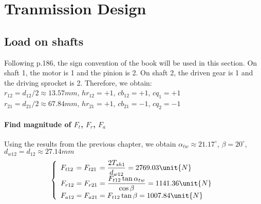 \section{Tranmission Design}
\subsection{Load on shafts}
Following p.186, the sign convention of the book will be used in this section. On shaft 1, the motor is 1 and the pinion is 2. On shaft 2, the driven gear is 1 and the driving sprocket is 2. Therefore, we obtain:\\
$ r_{12} = d_{12}/2 \approx 13.57\unit{mm}$, $ hr_{12} = +1 $, $ cb_{12} = +1 $, $ cq_1 = +1 $\\
$ r_{21} = d_{21}/2 \approx 67.84\unit{mm}$, $ hr_{21} = +1 $, $ cb_{21} = -1$, $ cq_2 = -1$
\paragraph{Find magnitude of $ F_{t} $, $ F_r $, $ F_a $}
Using the results from the previous chapter, we obtain $ \alpha_{tw} \approx 21.17^\circ $, $ \beta = 20^\circ $, $ d_{w12} = d_{12} \approx 27.14\unit{mm} $
\[
\left\{ 
\begin{array}{l@{{}={}}l@{{}={}}l}
F_{t12}& F_{t21}& \dfrac{2T_{sh1}}{d_{w12}}=2769.03\unit{N}\\
F_{r12}& F_{r21}&  \dfrac{F_{t12}\tan\alpha_{tw}}{\cos\beta}=1141.36\unit{N}\\
F_{a12}& F_{a21}& F_{t12}\tan\beta =1007.84\unit{N}\\ 
\end{array}
\right.
\]
